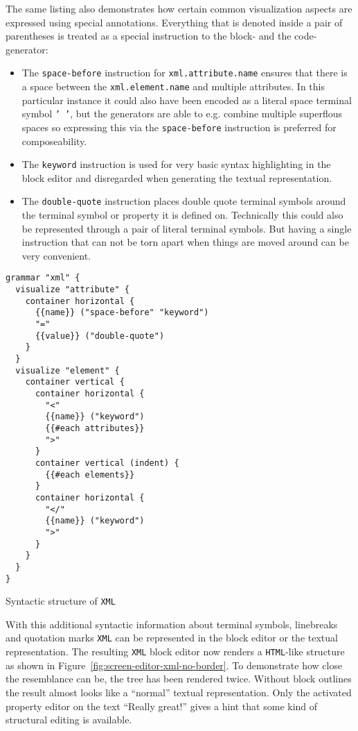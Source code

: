 \documentclass[sigconf,natbib=false,review=true,anonymous]{acmart}
\newenvironment{longlisting}{\captionsetup{type=listing} \vspace{1.5em}}{\vspace{1.5em}}
\begin{document}
The same listing also demonstrates how certain common visualization aspects are expressed using special annotations. Everything that is denoted inside a pair of parentheses is treated as a special instruction to the block- and the code-generator:
\begin{itemize}
\item The \texttt{space-before} instruction for \texttt{xml.attribute.name} ensures that there is a space between the \texttt{xml.element.name} and multiple attributes. In this particular instance it could also have been encoded as a literal space terminal symbol \texttt{'~'}, but the generators are able to e.g. combine multiple superflous spaces so expressing this via the \texttt{space-before} instruction is preferred for composeability.
\item The \texttt{keyword} instruction is used for very basic syntax highlighting in the block editor and disregarded when generating the textual representation.
\item The \texttt{double-quote} instruction places double quote terminal symbols around the terminal symbol or property it is defined on. Technically this could also be represented through a pair of literal terminal symbols. But having a single instruction that can not be torn apart when things are moved around can be very convenient.
\end{itemize}

\begin{longlisting}
\begin{verbatim}
grammar "xml" {
  visualize "attribute" {
    container horizontal {
      {{name}} ("space-before" "keyword")
      "="
      {{value}} ("double-quote")
    }
  }
  visualize "element" {
    container vertical {
      container horizontal {
        "<"
        {{name}} ("keyword")
        {{#each attributes}}
        ">"
      }
      container vertical (indent) {
        {{#each elements}}
      }
      container horizontal {
        "</"
        {{name}} ("keyword")
        ">"
      }
    }
  }
}
\end{verbatim}
\caption{Syntactic structure of \texttt{XML}}
\label{lst:grammar-xml-syntax}
\end{longlisting}


With this additional syntactic information about terminal symbols, linebreaks and quotation marks \texttt{XML} can be represented in the block editor or the textual representation. The resulting \texttt{XML} block editor now renders a \texttt{HTML}-like structure as shown in Figure~\ref{fig:screen-editor-xml-no-border}. To demonstrate how close the resemblance can be, the tree has been rendered twice. Without block outlines the result almost looks like a \enquote{normal} textual representation. Only the activated property editor on the text \enquote{Really great!} gives a hint that some kind of structural editing is available.
\end{document}
